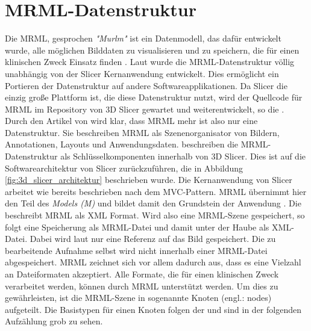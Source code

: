 \section{MRML-Datenstruktur}
\label{subsec:mrml_datenstruktur} Die \ac{MRML}, gesprochen \textit{"Murlm"} ist
ein Datenmodell, das dafür entwickelt wurde, alle möglichen Bilddaten zu visualisieren
und zu speichern, die für einen klinischen Zweck Einsatz finden \citep[vgl.][]{slicer2024}.
Laut \citet{slicer2024} wurde die \ac{MRML}-Datenstruktur völlig unabhängig von
der Slicer Kernanwendung entwickelt. Dies ermöglicht ein Portieren der Datenstruktur
auf andere Softwareapplikationen. Da Slicer die einzig große Plattform ist, die diese
Datenstruktur nutzt, wird der Quellcode für \ac{MRML} im Repository von 3D Slicer
gewartet und weiterentwickelt, so die \citet{slicer2024}. Durch den Artikel von
\citet[S.~1331]{fedorov2012slicer} wird klar, dass \ac{MRML} mehr ist also nur eine
Datenstruktur. Sie beschreiben \ac{MRML} als Szenenorganisator von Bildern,
Annotationen, Layouts und Anwendungsdaten. \citet[S.~1327]{fedorov2012slicer} beschreiben
die \ac{MRML}-Datenstruktur als Schlüsselkomponenten innerhalb von 3D Slicer. Dies
ist auf die Softwarearchitektur von Slicer zurückzuführen, die in Abbildung
\ref{fig:3d_slicer_architektur} beschrieben wurde. Die Kernanwendung von Slicer arbeitet
wie bereits beschrieben nach dem \ac{MVC}-Pattern. \ac{MRML} übernimmt hier den
Teil des \textit{Models (M)} und bildet damit den Grundstein der Anwendung \citep[vgl.][S.~1332]{fedorov2012slicer}.
Die \citet{slicer2024} beschreibt \ac{MRML} als \ac{XML} Format. Wird also eine \ac{MRML}-Szene
gespeichert, so folgt eine Speicherung als \ac{MRML}-Datei und damit unter der
Haube als \ac{XML}-Datei. Dabei wird laut \citet{slicer2024} nur eine Referenz auf
das Bild gespeichert. Die zu bearbeitende Aufnahme selbst wird nicht innerhalb
einer \ac{MRML}-Datei abgespeichert. \ac{MRML} zeichnet sich vor allem dadurch aus,
dass es eine Vielzahl an Dateiformaten akzeptiert. Alle Formate, die für einen
klinischen Zweck verarbeitet werden, können durch \ac{MRML} unterstützt werden. Um
dies zu gewährleisten, ist die \ac{MRML}-Szene in sogenannte Knoten (engl.:
nodes) aufgeteilt. Die Basistypen für einen Knoten folgen der \citet{slicer2024}
und sind in der folgenden Aufzählung grob zu sehen.

